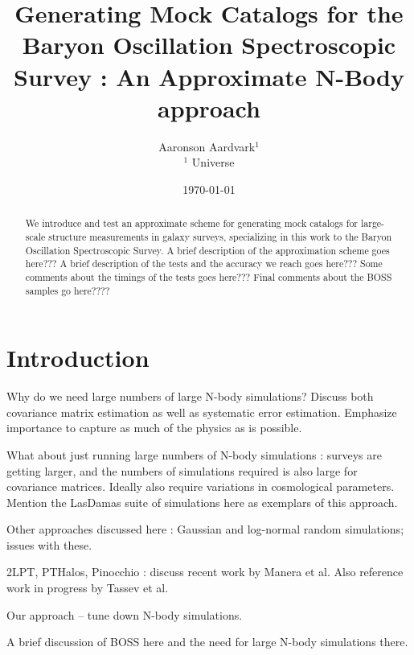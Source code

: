 \documentclass[usenatbib]{mn2e}
\begin{document}
\topmargin-1cm

\newcommand{\bd}{{\bm \delta}}


\title[Mock catalogs for BOSS]
{Generating Mock Catalogs for the Baryon Oscillation Spectroscopic Survey : An Approximate N-Body approach}
\author[People??]{Aaronson Aardvark$^{1}$ \\
$^{1}$ Universe \\
}

\date{\today}
\maketitle

\begin{abstract}
We introduce and test an approximate scheme for generating mock catalogs for
large-scale structure measurements in galaxy surveys, specializing in this work
to the Baryon Oscillation Spectroscopic Survey.
A brief description of the approximation scheme goes here??? A brief description
of the tests and the accuracy we reach goes here??? Some comments about the
timings of the tests goes here??? Final comments about the BOSS samples go
here????
\end{abstract}

\section{Introduction}

Why do we need large numbers of large N-body simulations? Discuss both
covariance matrix estimation as well as systematic error estimation. Emphasize
importance to capture as much of the physics as is possible.

What about just running large numbers of N-body simulations : surveys are
getting larger, and the numbers of simulations required is also large
for covariance matrices. Ideally also require variations in cosmological
parameters. Mention the LasDamas suite of simulations here as exemplars of this
approach. 

Other approaches discussed here : Gaussian and log-normal random simulations;
issues with these. 

2LPT, PTHalos, Pinocchio : discuss recent work by Manera et al. Also reference
work in progress by Tassev et al.

Our approach -- tune down N-body simulations.

A brief discussion of BOSS here and the need for large N-body simulations there. 
\end{document}
